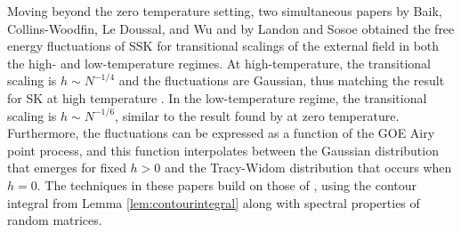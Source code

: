 \documentclass[11pt]{article}
\numberwithin{equation}{section}
\theoremstyle{remark}
\begin{document}
Moving beyond the zero temperature setting, two simultaneous papers by Baik, Collins-Woodfin, Le Doussal, and Wu \cite{Baiketal21} and by Landon and Sosoe \cite{landon2020fluctuations} obtained the free energy fluctuations of SSK for transitional scalings of the external field in both the high- and low-temperature regimes.  At high-temperature, the transitional scaling is $h\sim N^{-1/4}$ and the fluctuations are Gaussian, thus matching the result for SK at high temperature \cite{DeyWu23}. 
 In the low-temperature regime, the transitional scaling is $h\sim N^{-1/6}$, similar to the result found by \cite{FyodorovleDoussal,kivimae2019critical} at zero temperature.  Furthermore, the fluctuations can be expressed as a function of the GOE Airy point process, and this function interpolates between the Gaussian distribution that emerges for fixed $h>0$ and the Tracy-Widom distribution that occurs when $h=0$.  The techniques in these papers build on those of \cite{BL16}, using the contour integral from Lemma \ref{lem:contourintegral} along with spectral properties of random matrices.
\end{document}

